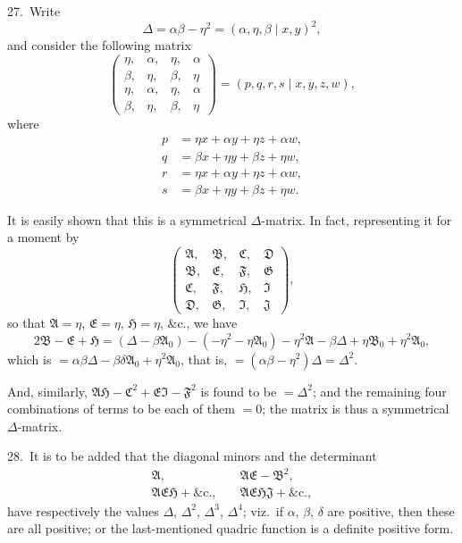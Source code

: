 \documentclass[11pt,a4paper]{article}
\theoremstyle{definition}
\begin{document}
27.\ Write
\[
\Delta = \alpha\beta - \eta^2 = (\alpha, \eta, \beta \mid x, y)^2,
\]
and consider the following matrix
\[
\begin{pmatrix}
\eta, & \alpha, & \eta, & \alpha\\
\beta, & \eta, & \beta, & \eta\\
\eta, & \alpha, & \eta, & \alpha\\
\beta, & \eta, & \beta, & \eta
\end{pmatrix}
= (p, q, r, s \mid x, y, z, w),
\]
where
\begin{align*}
p &= \eta x + \alpha y + \eta z + \alpha w,\\
q &= \beta x + \eta y + \beta z + \eta w,\\
r &= \eta x + \alpha y + \eta z + \alpha w,\\
s &= \beta x + \eta y + \beta z + \eta w.
\end{align*}

It is easily shown that this is a symmetrical $\Delta$-matrix. In fact, representing it for a moment by
\[
\begin{pmatrix}
\mathfrak{A}, & \mathfrak{B}, & \mathfrak{C}, & \mathfrak{D}\\
\mathfrak{B}, & \mathfrak{E}, & \mathfrak{F}, & \mathfrak{G}\\
\mathfrak{C}, & \mathfrak{F}, & \mathfrak{H}, & \mathfrak{I}\\
\mathfrak{D}, & \mathfrak{G}, & \mathfrak{I}, & \mathfrak{J}
\end{pmatrix},
\]
so that $\mathfrak{A} = \eta$, $\mathfrak{E} = \eta$, $\mathfrak{H} = \eta$, \&c., we have
\[
2\mathfrak{B} - \mathfrak{E} + \mathfrak{H} = (\Delta - \beta\mathfrak{A}_0) - (-\eta^2 - \eta\mathfrak{A}_0) - \eta^2\mathfrak{A} - \beta\Delta + \eta\mathfrak{B}_0 + \eta^2\mathfrak{A}_0,
\]
which is $= \alpha\beta\Delta - \beta\delta\mathfrak{A}_0 + \eta^2\mathfrak{A}_0$, that is, $= (\alpha\beta - \eta^2)\Delta = \Delta^2$.

And, similarly, $\mathfrak{A}\mathfrak{H} - \mathfrak{C}^2 + \mathfrak{E}\mathfrak{I} - \mathfrak{F}^2$ is found to be $= \Delta^2$; and the remaining four combinations of terms to be each of them $= 0$; the matrix is thus a symmetrical $\Delta$-matrix.

\medskip

28.\ It is to be added that the diagonal minors and the determinant
\begin{align*}
\mathfrak{A}, &\quad \mathfrak{A}\mathfrak{E} - \mathfrak{B}^2,\\
\mathfrak{A}\mathfrak{E}\mathfrak{H} + \text{\&c.}, &\quad \mathfrak{A}\mathfrak{E}\mathfrak{H}\mathfrak{J} + \text{\&c.},
\end{align*}
have respectively the values $\Delta$, $\Delta^2$, $\Delta^3$, $\Delta^4$; viz.\ if $\alpha$, $\beta$, $\delta$ are positive, then these are all positive; or the last-mentioned quadric function is a definite positive form.
\end{document}
